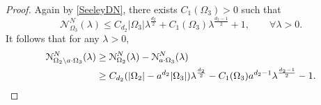 \documentclass[11pt,letterpaper]{amsart}
\numberwithin{equation}{section}
\theoremstyle{plain}
\theoremstyle{plain}
\numberwithin{equation}{section}
\theoremstyle{remark}
\begin{document}
\begin{proof} 	
	Again by \eqref{SeeleyDN}, there exists $C_1(\Omega_3)>0$ such that 
	\begin{equation}\label{re4}
		\mathcal N^N_{\Omega_3}(\lambda) \le C_{d_2}|\Omega_3| \lambda^{\frac {d_2} 2} + C_1(\Omega_3) \lambda^{\frac{d_2-1}{2}}+1,\qquad \forall \lambda>0.
	\end{equation}
	It follows that for any $\lambda>0$,
	\[ 
	\aligned
	\mathcal N^N_{\Omega_2\setminus a\cdot \Omega_3}(\lambda) & \ge \mathcal N^N_{\Omega_2}(\lambda)- \mathcal N^N_{a\cdot\Omega_3}(\lambda)%
	\\& \ge C_{d_2}(|\Omega_2|-a^{d_2}|\Omega_3|)\lambda^{\frac{d_2} 2}- C_1(\Omega_3)a^{d_2-1}\lambda^{\frac{d_2-1}{2}}-1.
	\endaligned\] 
	

\end{proof}
\end{document}
